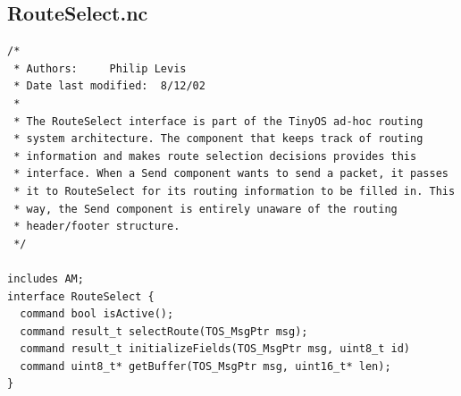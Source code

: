\documentclass[10pt]{article}
\begin{document}
\subsection*{RouteSelect.nc}
\scriptsize
\begin{verbatim}
/*
 * Authors:		Philip Levis
 * Date last modified:  8/12/02
 *
 * The RouteSelect interface is part of the TinyOS ad-hoc routing
 * system architecture. The component that keeps track of routing
 * information and makes route selection decisions provides this
 * interface. When a Send component wants to send a packet, it passes
 * it to RouteSelect for its routing information to be filled in. This
 * way, the Send component is entirely unaware of the routing
 * header/footer structure.
 */

includes AM;
interface RouteSelect {
  command bool isActive();
  command result_t selectRoute(TOS_MsgPtr msg);
  command result_t initializeFields(TOS_MsgPtr msg, uint8_t id)
  command uint8_t* getBuffer(TOS_MsgPtr msg, uint16_t* len);
}
\end{verbatim}
\normalsize
\end{document}
